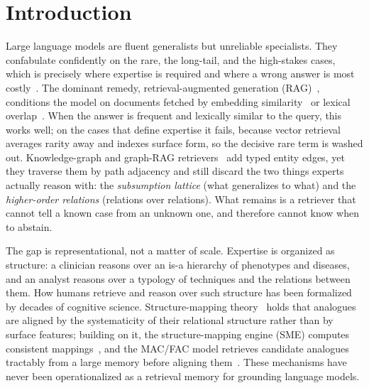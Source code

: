 \documentclass[pdflatex,sn-nature]{sn-jnl}
\begin{document}

\maketitle

\section{Introduction}\label{sec:intro}

Large language models are fluent generalists but unreliable specialists. They
confabulate confidently on the rare, the long-tail, and the high-stakes cases,
which is precisely where expertise is required and where a wrong answer is most
costly~\cite{ji2023hallucination,xiong2024mirage}. The dominant remedy,
retrieval-augmented generation (RAG)~\cite{lewis2020rag}, conditions the model on
documents fetched by embedding similarity~\cite{karpukhin2020dpr} or lexical
overlap~\cite{robertson2009bm25}. When the answer is frequent and lexically
similar to the query, this works well; on the cases that define expertise it
fails, because vector retrieval averages rarity away and indexes surface form, so
the decisive rare term is washed out. Knowledge-graph and graph-RAG
retrievers~\cite{gutierrez2024hipporag,edge2024graphrag} add typed entity edges,
yet they traverse them by path adjacency and still discard the two things experts
actually reason with: the \emph{subsumption lattice} (what generalizes to what)
and the \emph{higher-order relations} (relations over relations). What remains is
a retriever that cannot tell a known case from an unknown one, and therefore
cannot know when to abstain.

The gap is representational, not a matter of scale. Expertise is organized as
structure: a clinician reasons over an is-a hierarchy of phenotypes and diseases,
and an analyst reasons over a typology of techniques and the relations between
them. How humans retrieve and reason over such structure has been formalized by
decades of cognitive science. Structure-mapping theory~\cite{gentner1983structure}
holds that analogues are aligned by the systematicity of their relational
structure rather than by surface features; building on it, the structure-mapping
engine (SME) computes consistent mappings~\cite{falkenhainer1989sme}, and the
MAC/FAC model retrieves candidate analogues tractably from a large memory before
aligning them~\cite{forbus1995macfac,gentner2011computational}. These mechanisms
have never been operationalized as a retrieval memory for grounding language
models.
\end{document}
